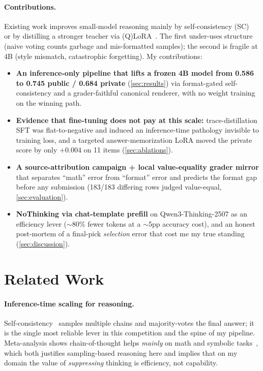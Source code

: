 \documentclass{article}
\newcommand{\new}[1]{#1}
\begin{document}
\new{
\paragraph{Contributions.}
Existing work improves small-model reasoning mainly by self-consistency
(SC)~\citep{wang2023sc} or by distilling a stronger teacher via
(Q)LoRA~\citep{dettmers2023qlora}. The first under-uses structure (naive voting
counts garbage and mis-formatted samples); the second is fragile at 4B (style
mismatch, catastrophic forgetting). My contributions:
\begin{itemize}
  \item \textbf{An inference-only pipeline that lifts a frozen 4B model from
        0.586 to 0.745 public / 0.684 private} (\cref{sec:results}) via
        format-gated self-consistency and a grader-faithful canonical renderer, with
        no weight training on the winning path.
  \item \textbf{Evidence that fine-tuning does not pay at this scale:} trace-distillation
        SFT was flat-to-negative and induced an inference-time pathology invisible to
        training loss, and a targeted answer-memorization LoRA moved the private
        score by only $+0.004$ on 11 items (\cref{sec:ablations}).
  \item \textbf{A source-attribution campaign + local value-equality grader mirror}
        that separates ``math'' error from ``format'' error and predicts the format
        gap before any submission (183/183 differing rows judged value-equal,
        \cref{sec:evaluation}).
  \item \textbf{NoThinking via chat-template prefill} on Qwen3-Thinking-2507 as an
        efficiency lever ($\sim$80\% fewer tokens at a $\sim$5pp accuracy cost), and an
        honest post-mortem of a final-pick \emph{selection} error that cost me my
        true standing (\cref{sec:discussion}).
\end{itemize}
}

\section{Related Work}
\label{sec:relatedwork}

\paragraph{Inference-time scaling for reasoning.}
Self-consistency~\citep{wang2023sc} samples multiple chains and majority-votes the
final answer; it is the single most reliable lever in this competition and the spine
of my pipeline. Meta-analysis shows chain-of-thought helps \emph{mainly} on math and
symbolic tasks~\citep{sprague2024cot}, which both justifies sampling-based reasoning
here and implies that on my domain the value of \emph{suppressing} thinking is
efficiency, not capability.
\end{document}
